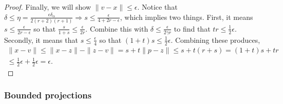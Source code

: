 \begin{proof}
Finally, we will show $\|v - x\| \le \epsilon$.
Notice that $\delta \le \eta = \frac{\epsilon\delta_{\alpha}}{2(r+2)(r + 1)} \Longrightarrow s \le \frac{\epsilon}{4 + 2r - \epsilon}$, which implies two things.
First, it means $s \le \frac{\epsilon}{2r - \epsilon}$ so that
$\frac {s}{1 + s} \le \frac {\epsilon} {2r}. $
Combine this with $\delta \le \frac {\epsilon} {2\gamma r}$ to find that $tr \le \frac 1 2 \epsilon$.
Secondly, it means that
$s \le \frac{\epsilon}{4}$ so that $(1 + t)s \le \frac 1 2 \epsilon$.
Combining these produces,
\begin{align*}
\|x - v\| 
\le \|x - z\| - \|z - v\| 
= s + t \|p - z\| 
\le s + t \left(r + s\right) 
= (1 + t)s + tr \\
\le \frac 1 2 \epsilon + \frac 1 2 \epsilon = \epsilon.
\end{align*}

\end{proof}

\subsubsection{Bounded projections}
\label{simplifed_bounded_projection}




